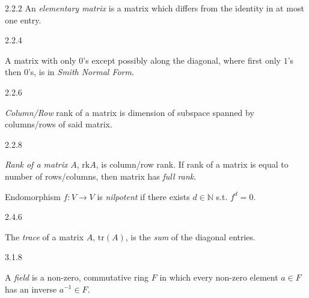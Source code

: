 \documentclass[10pt]{article} %
\begin{document}
\begin{multicols}{3}
\begin{definition}{2.2.2}{}
    An \emph{elementary matrix} is a matrix which differs from the identity in at most one entry.

\end{definition}

\begin{definition}{2.2.4}{}

    A matrix with only $0$'s except possibly along the diagonal, where first only $1$'s then $0$'s, is in \emph{Smith Normal Form}.

\end{definition}

\begin{definition}{2.2.6}{}

    \emph{Column/Row} rank of a matrix is dimension of subspace spanned by columns/rows of said matrix.

\end{definition}

\begin{definition}{2.2.8}{}

    \emph{Rank of a matrix} $A$, $\mathrm{rk}A$, is column/row rank. If rank of a matrix is equal to number of rows/columns, then matrix has \emph{full rank}.

\end{definition}

\begin{definition}{32}{}

    Endomorphism $f: V \to V$ is \emph{nilpotent} if there exists $d \in \mathbb{N}$ s.t. $f^d = 0$.

\end{definition}

\begin{definition}{2.4.6}{}

    The \emph{trace} of a matrix $A$, $\mathrm{tr}(A)$, is the \emph{sum} of the diagonal entries.

\end{definition}


\begin{definition}{3.1.8}{}

    A \emph{field} is a non-zero, commutative ring $F$ in which every non-zero element $a \in F$ has an inverse $a^{-1} \in F$.

\end{definition}


\end{multicols}
\end{document}
